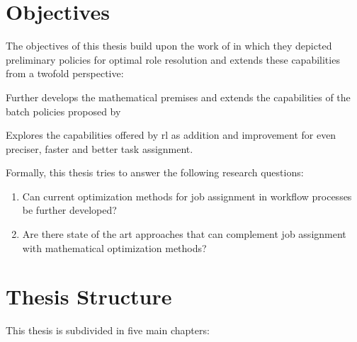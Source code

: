 \documentclass[draft=false]{seal_thesis}
\begin{document}
\section{Objectives}
\label{sec:objectives}

The objectives of this thesis build upon the work of \citet{Zeng2005} in which they depicted preliminary policies for optimal role resolution and extends these capabilities from a twofold perspective:
\begin{enumerate*}
	\item Further develops the mathematical premises and extends the capabilities of the batch policies proposed by \citet{Zeng2005}
	\item Explores the capabilities offered by \gls{rl} as addition and improvement for even preciser, faster and better task assignment.
\end{enumerate*}

Formally, this thesis tries to answer the following research questions:

\begin{enumerate}[label=\textbf{RQ. \arabic*},ref=Research Question \arabic*]
\item Can current optimization methods for job assignment in workflow processes be further developed? \label{rq:one}
\item Are there state of the art approaches that can complement job assignment with mathematical optimization methods? \label{rq:two}
\end{enumerate}

\section{Thesis Structure}

This thesis is subdivided in five main chapters:
\end{document}
